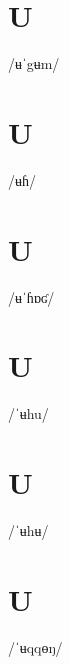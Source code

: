 \documentclass[10pt,a4paper,twoside]{book}
\begin{document}
\section*{U}

\begin{multicols}{3}
 {/ʉˈgʉm/} {}
\end{multicols}

\section*{U}

\begin{multicols}{3}
 {/ʉɦ/} {}
\end{multicols}

\section*{U}

\begin{multicols}{3}
 {/ʉˈɦɒʛ/} {}
\end{multicols}

\section*{U}

\begin{multicols}{3}
 {/ˈʉhu/} {}
\end{multicols}

\section*{U}

\begin{multicols}{3}
 {/ˈʉhʉ/} {}
\end{multicols}

\section*{U}

\begin{multicols}{3}
 {/ˈʉqqɵŋ/} {}
\end{multicols}
\end{document}
